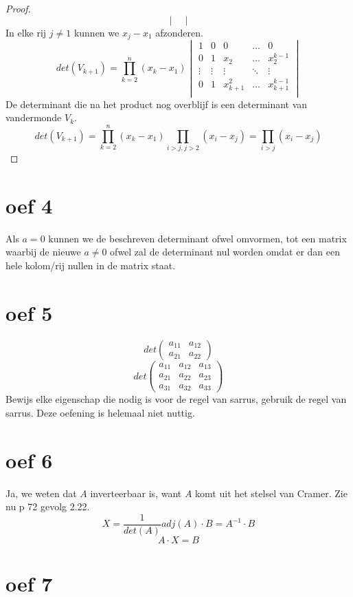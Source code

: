 \documentclass[lineaire_algebra_oplossingen.tex]{subfiles}
\begin{document}
\begin{proof}
\[\begin{vmatrix}
\end{vmatrix}
\]
In elke rij $j \neq 1$ kunnen we $x_j-x_1$ afzonderen.
\[
det(V_{k+1}) =
\prod_{k=2}^n(x_k-x_1)
\begin{vmatrix}
1 & 0 & 0 & \hdots & 0\\
0 & 1 & x_2 & \hdots & x_2^{k-1}\\
\vdots &\vdots &\vdots & \ddots & \vdots \\
0 & 1 & x_{k+1}^2  & \hdots & x_{k+1}^{k-1}\\
\end{vmatrix}
\]
De determinant die na het product nog overblijf is een determinant van vandermonde $V_k$.
\[
det(V_{k+1}) =
\prod_{k=2}^n(x_k-x_1)
\prod_{i>j,j>2}(x_i-x_j)
= \prod_{i>j}(x_i-x_j)
\]
\end{proof}

\section{oef 4}
Als $a=0$ kunnen we de beschreven determinant ofwel omvormen, tot een matrix waarbij de nieuwe $a \neq 0$ ofwel zal de determinant nul worden omdat er dan een hele kolom/rij nullen in de matrix staat. 

\section{oef 5}
\[
det\left(
\begin{matrix}
a_{11} & a_{12}\\
a_{21} & a_{22}
\end{matrix}
\right)
\]
\[
det\left(
\begin{matrix}
a_{11} & a_{12} & a_{13}\\
a_{21} & a_{22} & a_{23}\\
a_{31} & a_{32} & a_{33}
\end{matrix}
\right)
\]
Bewijs elke eigenschap die nodig is voor de regel van sarrus, gebruik de regel van sarrus. Deze oefening is helemaal niet nuttig.

\section{oef 6}
Ja, we weten dat $A$ inverteerbaar is, want $A$ komt uit het stelsel van Cramer. Zie nu p 72 gevolg 2.22.
\[
X = \frac{1}{det(A)}adj(A)\cdot B = A^{-1}\cdot B
\]
\[
A\cdot X = B
\]

\section{oef 7}
\end{document}
